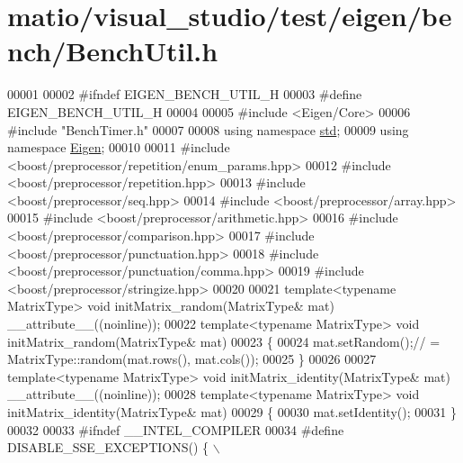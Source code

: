 \hypertarget{matio_2visual__studio_2test_2eigen_2bench_2_bench_util_8h_source}{}\section{matio/visual\+\_\+studio/test/eigen/bench/\+Bench\+Util.h}
\label{matio_2visual__studio_2test_2eigen_2bench_2_bench_util_8h_source}

\begin{DoxyCode}
00001 
00002 \textcolor{preprocessor}{#ifndef EIGEN\_BENCH\_UTIL\_H}
00003 \textcolor{preprocessor}{#define EIGEN\_BENCH\_UTIL\_H}
00004 
00005 \textcolor{preprocessor}{#include <Eigen/Core>}
00006 \textcolor{preprocessor}{#include "BenchTimer.h"}
00007 
00008 \textcolor{keyword}{using namespace }\hyperlink{namespacestd}{std};
00009 \textcolor{keyword}{using namespace }\hyperlink{namespace_eigen}{Eigen};
00010 
00011 \textcolor{preprocessor}{#include <boost/preprocessor/repetition/enum\_params.hpp>}
00012 \textcolor{preprocessor}{#include <boost/preprocessor/repetition.hpp>}
00013 \textcolor{preprocessor}{#include <boost/preprocessor/seq.hpp>}
00014 \textcolor{preprocessor}{#include <boost/preprocessor/array.hpp>}
00015 \textcolor{preprocessor}{#include <boost/preprocessor/arithmetic.hpp>}
00016 \textcolor{preprocessor}{#include <boost/preprocessor/comparison.hpp>}
00017 \textcolor{preprocessor}{#include <boost/preprocessor/punctuation.hpp>}
00018 \textcolor{preprocessor}{#include <boost/preprocessor/punctuation/comma.hpp>}
00019 \textcolor{preprocessor}{#include <boost/preprocessor/stringize.hpp>}
00020 
00021 \textcolor{keyword}{template}<\textcolor{keyword}{typename} MatrixType> \textcolor{keywordtype}{void} initMatrix\_random(MatrixType& mat) \_\_attribute\_\_((noinline));
00022 \textcolor{keyword}{template}<\textcolor{keyword}{typename} MatrixType> \textcolor{keywordtype}{void} initMatrix\_random(MatrixType& mat)
00023 \{
00024   mat.setRandom();\textcolor{comment}{// = MatrixType::random(mat.rows(), mat.cols());}
00025 \}
00026 
00027 \textcolor{keyword}{template}<\textcolor{keyword}{typename} MatrixType> \textcolor{keywordtype}{void} initMatrix\_identity(MatrixType& mat) \_\_attribute\_\_((noinline));
00028 \textcolor{keyword}{template}<\textcolor{keyword}{typename} MatrixType> \textcolor{keywordtype}{void} initMatrix\_identity(MatrixType& mat)
00029 \{
00030   mat.setIdentity();
00031 \}
00032 
00033 \textcolor{preprocessor}{#ifndef \_\_INTEL\_COMPILER}
00034 \textcolor{preprocessor}{#define DISABLE\_SSE\_EXCEPTIONS()  \{ \(\backslash\)}

\end{DoxyCode}
